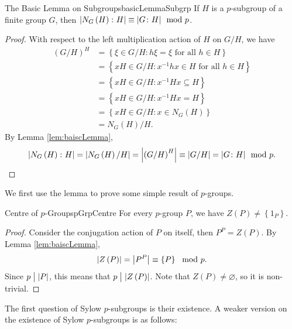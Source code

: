 \documentclass[math]{amznotes}
\theoremstyle{remark}
\newcommand{\0}{\mathbf{0}}
\newcommand{\1}{\mathbf{1}}
\begin{document}
\begin{corbox}{The Basic Lemma on Subgroups}{basicLemmaSubgrp}
    If $H$ is a $p$-subgroup of a finite group $G$, then ${\left\lvert {N_G\left(H\right) \colon H} \right\rvert} \equiv {\left\lvert {G \colon H} \right\rvert} \mod p$.
    \tcblower
    \begin{proof}
        With respect to the left multiplication action of $H$ on $G \slash H$, we have 
        \begin{align*}
            \left(G \slash H\right)^H & = \left\{\xi \in G \slash H \colon h\xi = \xi \textrm{ for all } h \in H\right\} \\
            & = \left\{xH \in G \slash H \colon x^{-1}hx \in H \textrm{ for all } h \in H\right\} \\
            & = \left\{xH \in G \slash H \colon x^{-1}Hx \subseteq H\right\} \\
            & = \left\{xH \in G \slash H \colon x^{-1}Hx = H\right\} \\
            & = \left\{xH \in G \slash H \colon x \in N_G\left(H\right)\right\} \\
            & = N_G\left(H\right) \slash H.
        \end{align*}
        By Lemma \ref{lem:baiscLemma}, 
        \begin{equation*}
            {\left\lvert {N_G\left(H\right) \colon H} \right\rvert} = {\left\lvert {N_G\left(H\right) \slash H} \right\rvert} = {\left\lvert {\left(G \slash H\right)^H} \right\rvert} \equiv {\left\lvert {G \slash H} \right\rvert} = {\left\lvert {G \colon H} \right\rvert} \mod p.
        \end{equation*}
    \end{proof}
\end{corbox}
We first use the lemma to prove some simple result of $p$-groups.
\begin{probox}{Centre of $p$-Groups}{pGrpCentre}
    For every $p$-group $P$, we have $Z\left(P\right) \neq \left\{1_P\right\}$. 
    \tcblower
    \begin{proof}
        Consider the conjugation action of $P$ on itself, then $P^P = Z\left(P\right)$. By Lemma \ref{lem:baiscLemma}, 
        \begin{equation*}
            {\left\lvert {Z\left(P\right)} \right\rvert} = {\left\lvert {P^P} \right\rvert} \equiv \left\{P\right\} \mod p.
        \end{equation*}
        Since $p \bigm\vert {\left\lvert {P} \right\rvert}$, this means that $p \bigm\vert {\left\lvert {Z\left(P\right)} \right\rvert}$. Note that $Z\left(P\right) \neq \varnothing$, so it is non-trivial.
    \end{proof}
\end{probox}
The first question of Sylow $p$-subgroups is their existence. A weaker version on the existence of Sylow $p$-subgroups is as follows:
\end{document}
